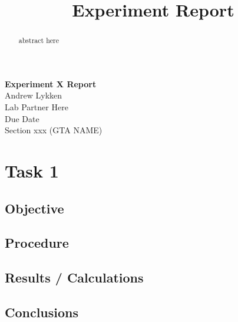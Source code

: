 \documentclass[notitlepage, 12pt]{report}  %
\title{Experiment  Report}
\begin{document}


\begin{center}
\large \textbf{Experiment X Report} \\ %
\small 
Andrew Lykken\\
Lab Partner Here\\
Due Date\\
Section xxx (GTA NAME)\\

\end{center}

\vspace{4in}


\begin{abstract}
abstract here 
\end{abstract}

\newpage

\section*{Task 1} %


\subsection*{Objective}

\subsection*{Procedure}

\subsection*{Results / Calculations}


\subsection*{Conclusions}




\newpage

\printbibliography[title={\Large References}] %
\end{document}
